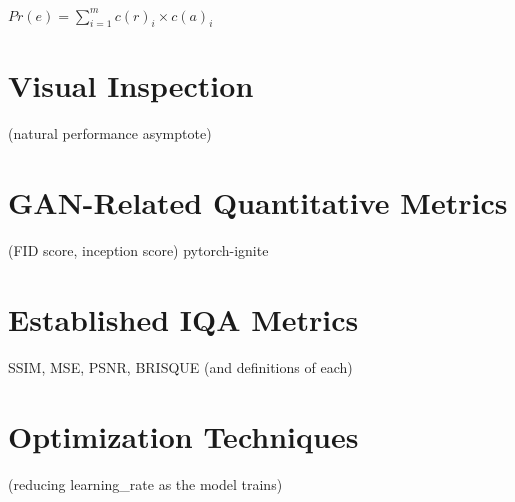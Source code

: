 

\begin{center}
$Pr(e) = \displaystyle\sum_{i=1}^{m} c(r)_i \times c(a)_i $
\end{center}


\section{Visual Inspection}

(natural performance asymptote)

\section{GAN-Related Quantitative Metrics}

(FID score, inception score)
pytorch-ignite

\section{Established IQA Metrics}
SSIM, MSE, PSNR, BRISQUE (and definitions of each)

\section{Optimization Techniques}

(reducing learning\_rate as the model trains)
